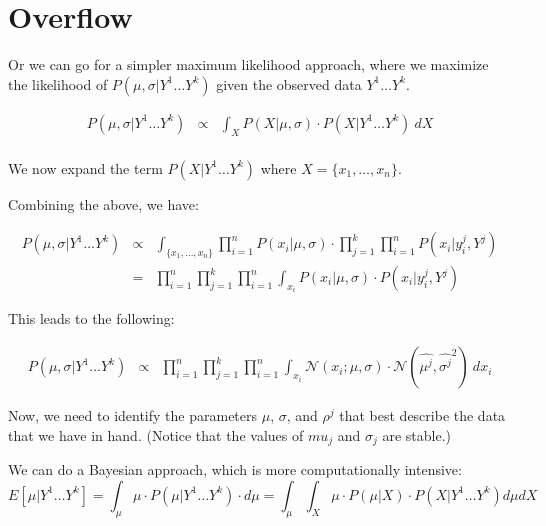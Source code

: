 \section{Overflow}




Or we can go for a simpler maximum likelihood approach, where we maximize the likelihood of $P(\mu, \sigma | Y^1 \ldots Y^k)$ given the observed data $Y^1 \ldots Y^k$.



\begin{eqnarray}
P(\mu, \sigma | Y^1 \ldots Y^k) 
& \propto & \int_X  P(X | \mu,  \sigma) \cdot P ( X | Y^1 \ldots Y^k) \ dX \nonumber \\
\end{eqnarray}

We now expand the term $P ( X | Y^1 \ldots Y^k)$ where $X=\{x_1,\ldots,x_n\}$.




Combining the above, we have:

\begin{eqnarray}
P(\mu, \sigma | Y^1 \ldots Y^k) 
& \propto & \int_{\{x_1,\ldots,x_n\}}  \prod_{i=1}^n P(x_i | \mu,  \sigma) \cdot \prod_{j=1}^k \prod_{i=1}^n P (  x_i | y_i^j, Y^j ) \\
& = & \prod_{i=1}^n \prod_{j=1}^k \prod_{i=1}^n \int_{x_i}   P(x_i | \mu,  \sigma) \cdot  P (  x_i | y_i^j, Y^j )
\end{eqnarray}



This leads to the following:

\begin{eqnarray}
P(\mu, \sigma | Y^1 \ldots Y^k) 
& \propto & \prod_{i=1}^n \prod_{j=1}^k \prod_{i=1}^n \int_{x_i}   \mathcal{N}(x_i; \mu, \sigma) \cdot  \mathcal{N}(\widehat{\mu^j} ,\widehat{\sigma^j}^2 ) \ dx_i
\end{eqnarray}




Now, we need to identify the parameters $\mu$, $\sigma$, and $\rho^j$ that best describe the data that we have in hand. (Notice that the values of $mu_j$ and $\sigma_j$ are stable.)





We can do a Bayesian approach, which is more computationally intensive:
\begin{equation}
E[\mu | Y^1 \ldots Y^k]  =
\int_\mu \mu \cdot P(\mu | Y^1 \ldots Y^k) \cdot d\mu=
\int_\mu \int_X \mu \cdot  P(\mu | X) \cdot P ( X | Y^1 \ldots Y^k) d\mu dX \end{equation}